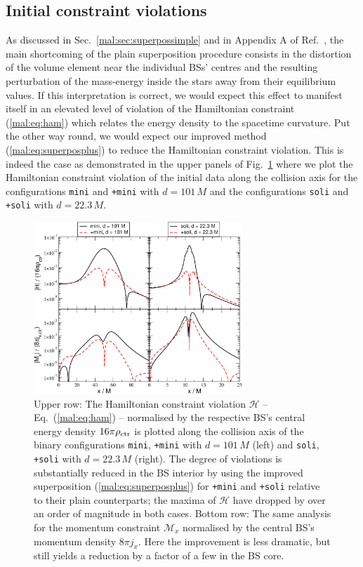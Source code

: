 \subsection{Initial constraint violations}
%
As discussed in Sec.~\ref{mal:sec:superpossimple} and in Appendix
A of Ref.~\cite{Helfer:2018vtq},
the main shortcoming of the plain superposition procedure
consists in the distortion of the volume element near the
individual BSs' centres and the resulting perturbation
of the mass-energy inside the stars away from their equilibrium
values. If this interpretation is correct, we would expect
this effect to manifest itself in an elevated level of violation
of the Hamiltonian constraint
(\ref{mal:eq:ham}) which relates the energy density to the
spacetime curvature. Put the other way round, we would
expect our improved method (\ref{mal:eq:superposplus}) to reduce the
Hamiltonian constraint violation. This is indeed the case
as demonstrated in the upper panels of
Fig.~\ref{mal:fig:ham} where we plot the
Hamiltonian constraint violation of the initial data
along the collision axis for the configurations
{\tt mini} and {\tt +mini} with $d=101\,M$ and 
the configurations {\tt soli} and {\tt +soli} with
$d=22.3\,M$.
%
\begin{figure}
  \centering
  \includegraphics[width=0.7\textwidth]{malaise_source/constraints.pdf}
  \caption{Upper row: The Hamiltonian constraint violation $\mathcal{H}$ --
  Eq.~(\ref{mal:eq:ham}) -- normalised by the respective BS's
  central energy density $16\pi \rho_{\rm ctr}$
  is plotted along the collision
  axis of the binary configurations {\tt mini}, {\tt +mini}
  with $d=101\,M$ (left) and {\tt soli}, {\tt +soli} with $d=22.3\,M$ (right).
  The degree of violations is substantially reduced in the
  BS interior by using
  the improved superposition (\ref{mal:eq:superposplus})
  for {\tt +mini} and {\tt +soli} relative to their plain
  counterparts; the maxima of $\mathcal{H}$ have dropped by
  over an order of magnitude in both cases.
  Bottom row: The same analysis for the momentum constraint
  $\mathcal{M}_x$
  normalised by the central BS's momentum density
  $8\pi j_x$. Here the improvement is less dramatic,
  but still yields a reduction by a factor of a few
  in the BS core.
  }
  \label{mal:fig:ham}
\end{figure}
%

